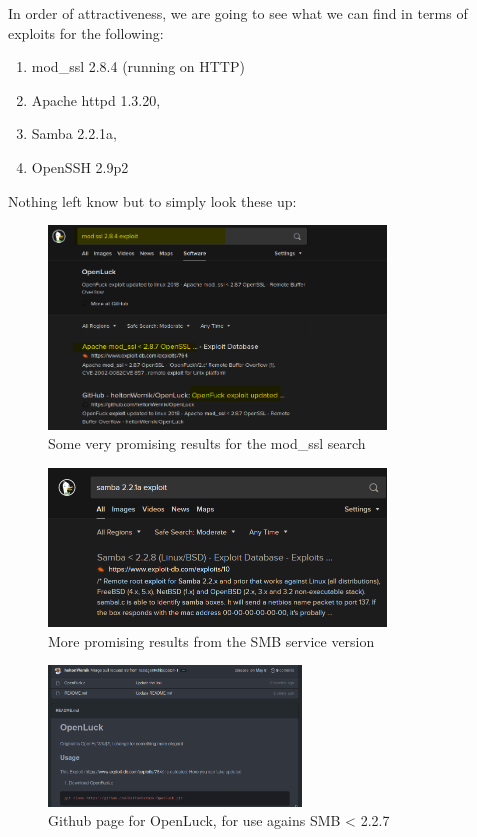 \documentclass[a4paper,11pt]{article}
\renewcommand{\textbf}{\bf}
\begin{document}
In order of attractiveness, we are going to see what we can find in terms of exploits for the following:
\begin{enumerate}[label=\textbf{\arabic*}.]
    \item mod\_ssl 2.8.4 (running on HTTP)
    \item Apache httpd 1.3.20,
    \item Samba 2.2.1a,
    \item OpenSSH 2.9p2
\end{enumerate}
Nothing left know but to simply look these up:

\begin{figure}[h]
    \centering
    \includegraphics[width=0.8\textwidth]{images/modssl_search.png}
    \caption{Some very promising results for the mod\_ssl search}
\end{figure}

\begin{figure}[h]
    \centering
    \includegraphics[width=0.8\textwidth]{images/samba221a_search.png}
    \caption{More promising results from the SMB service version}
\end{figure}
\pagebreak

\begin{figure}[h]
    \centering
    \includegraphics[width=0.6\textwidth]{images/openLuck.png}
    \caption{Github page for OpenLuck, for use agains SMB \textless{} 2.2.7}
    \label{fig:openLuck}
\end{figure}
\end{document}
